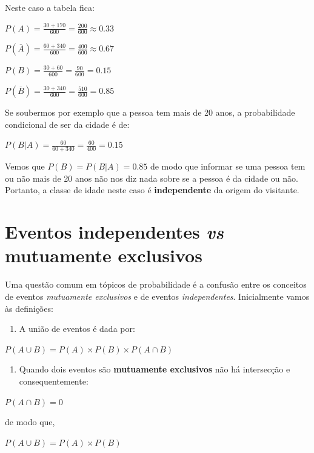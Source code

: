 \documentclass[
]{book}
\providecommand{\tightlist}{%
  \setlength{\itemsep}{0pt}\setlength{\parskip}{0pt}}
\begin{document}
Neste caso a tabela fica:

\(P(A) = \frac{30 + 170}{600} = \frac{200}{600} \approx 0.33\)

\(P(\overline{A}) = \frac{60 + 340}{600} = \frac{400}{600} \approx 0.67\)

\(P(B) = \frac{30 + 60}{600} = \frac{90}{600} = 0.15\)

\(P(\overline{B}) = \frac{30 + 340}{600} = \frac{510}{600} = 0.85\)

Se soubermos por exemplo que a pessoa tem mais de 20 anos, a probabilidade condicional de ser da cidade é de:

\(P(B|A) = \frac{60}{60 + 340} = \frac{60}{400} = 0.15\)

Vemos que \(P(B) = P(B|A) = 0.85\) de modo que informar se uma pessoa tem ou não mais de 20 anos não nos diz nada sobre se a pessoa é da cidade ou não. Portanto, a classe de idade neste caso é \textbf{independente} da origem do visitante.

\hypertarget{eventos-independentes-vs-mutuamente-exclusivos}{%
\section{\texorpdfstring{Eventos independentes \emph{vs} mutuamente exclusivos}{Eventos independentes vs mutuamente exclusivos}}\label{eventos-independentes-vs-mutuamente-exclusivos}}

Uma questão comum em tópicos de probabilidade é a confusão entre os conceitos de eventos \emph{mutuamente exclusivos} e de eventos \emph{independentes}. Inicialmente vamos às definições:

\begin{enumerate}
\def\labelenumi{\arabic{enumi}.}
\tightlist
\item
  A união de eventos é dada por:
\end{enumerate}

\(P(A \cup B) = P(A) \times P(B) \times P(A \cap B)\)

\begin{enumerate}
\def\labelenumi{\arabic{enumi}.}
\setcounter{enumi}{1}
\tightlist
\item
  Quando dois eventos são \textbf{mutuamente exclusivos} não há intersecção e consequentemente:
\end{enumerate}

\(P(A \cap B) = 0\)

de modo que,

\(P(A \cup B) = P(A) \times P(B)\)
\end{document}
